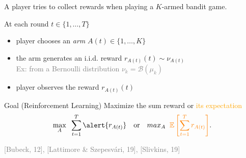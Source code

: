 \begin{frameO}

    A player tries to collect \alert{rewards} when playing a $K$-armed \slotmachine{} bandit game.

    \begin{lightblock}{}
        At each round $t\in\{1,\dots,T\}$
        \begin{itemize}
            \item
                player chooses an \emph{arm} \slotmachine{} \(A(t) \in \{1,\dots,K\}\)
            \item
                the arm generates an i.i.d. \alert{reward} $r_{A(t)}(t) \sim \nu_{A(t)}$\\
                \textcolor{gray}{Ex: from a Bernoulli distribution $\nu_{k} = \mathcal{B}(\mu_k)$}
            \item
                player observes the reward $r_{A(t)}(t)$
        \end{itemize}
    \end{lightblock}

    \pause

    \begin{colorblock}{Goal (Reinforcement Learning)}
        Maximize the \alert{sum reward} or \textcolor{orange}{its expectation}
        \[\max_{A} \;\; \sum\limits_{t=1}^{T} \alert{r_{A(t)}} \,\,\,\,\,\, \text{or} \,\,\,\,\,\, max_{A} \;\; \textcolor{orange}{ \mathbb{E}\left[\sum\limits_{t=1}^{T} r_{A(t)}\right] }.\]
    \end{colorblock}

    \vfill{}
    \hfill{} {\small \textcolor{gray}{[Bubeck, 12], [Lattimore \& Szepesvári, 19], [Slivkins, 19]}}

\end{frameO}

